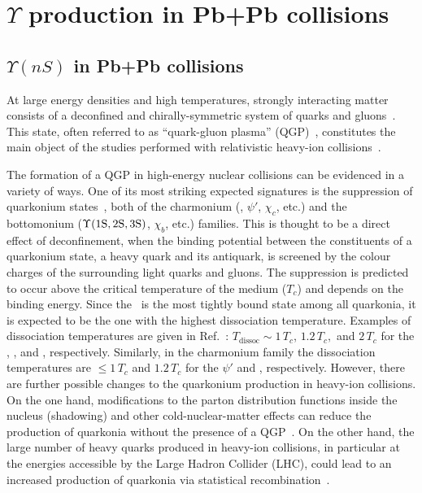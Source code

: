 \chapter{$\Upsilon$ production in Pb+Pb collisions}
\label{chap:UpsilonProductionPbPb}

\section{$\Upsilon(nS)$ in Pb+Pb collisions}
At large energy densities and high temperatures, strongly interacting
matter consists of a deconfined and chirally-symmetric system of
quarks and gluons~\cite{Karsch:2003jg}. This state, often referred to
as ``quark-gluon plasma'' (QGP)~\cite{Shuryak:1977ut}, constitutes the
main object of the studies performed with relativistic heavy-ion
collisions~\cite{Arsene:2004fa,Back:2004je,Adcox:2004mh,Adams:2005dq}.

The formation of a QGP in high-energy nuclear collisions can be
evidenced in a variety of ways. One of its most striking expected
signatures is the suppression of quarkonium
states~\cite{SATZ}, both of the charmonium (\Jpsi, $\psi'$,
$\chi_c$, etc.) and the bottomonium ($\Upsilon\text{(1S,\,2S,\,3S)}$,
$\chi_b$, etc.) families.  This is thought to be a direct effect of
deconfinement, when the binding potential between the constituents of
a quarkonium state, a heavy quark and its antiquark, is screened by
the colour charges of the surrounding light quarks and gluons.  The
suppression is predicted to occur above the critical temperature of
the medium ($T_c$) and depends on the \QQbar binding energy. Since the
\PgUa\ is the most tightly bound state among all quarkonia, it is
expected to be the one with the highest dissociation
temperature. Examples of dissociation temperatures are given in
Ref.~\cite{Mocsy:2007jz}: $T_{\text{dissoc}}\sim\!1\,T_c$, $1.2\,T_c,$
and $2\,T_c$ for the \PgUc, \PgUb, and \PgUa, respectively. Similarly,
in the charmonium family the dissociation temperatures are
$\leq1\,T_c$ and $1.2\,T_c$ for the $\psi'$ and \Jpsi,
respectively. However, there are further possible changes to the
quarkonium production in heavy-ion collisions. On the one hand,
modifications to the parton distribution functions inside the nucleus
(shadowing) and other cold-nuclear-matter effects can reduce the
production of quarkonia without the presence of a
QGP~\cite{Vogt:2010aa,Zhao:2011cv}. On the other hand, the large
number of heavy quarks produced in heavy-ion collisions, in particular
at the energies accessible by the Large Hadron Collider (LHC), could
lead to an increased production of quarkonia via statistical
recombination~\cite{Zhao:2010nk,Andronic:2006ky,Capella:2007jv,Thews:2005vj,Yan:2006ve,Grandchamp:2005yw}.

